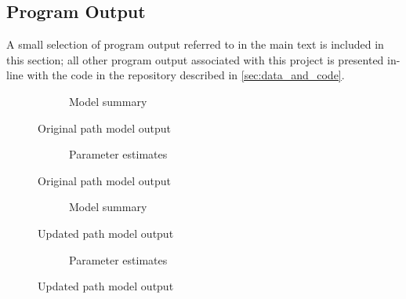 \documentclass[11pt,a4paper]{article}
\begin{document}
\clearpage
\subsection{Program Output}\label{sec:program_output}

A small selection of program output referred to in the main text is included in this section; all other program output associated with this project is presented in-line with the code in the repository described in \cref{sec:data_and_code}.

\pagestyle{empty}

\begin{figure}[htbp]
\begin{subfigure}{\textwidth}
\small{}
\caption{Model summary}
\end{subfigure}
\caption{Original path model output}
\label{fig:orig_model_output}
\end{figure}

\begin{figure}[htbp]\ContinuedFloat
\begin{subfigure}{\textwidth}

\caption{Parameter estimates}
\end{subfigure}
\caption{Original path model output}
\end{figure}

\begin{figure}[htbp]
\begin{subfigure}{\textwidth}
\small{}
\caption{Model summary}
\end{subfigure}
\caption{Updated path model output}
\label{fig:updated_model_output}
\end{figure}

\begin{figure}[htbp]\ContinuedFloat
\begin{subfigure}{\textwidth}

\caption{Parameter estimates}
\end{subfigure}
\caption{Updated path model output}
\end{figure}


\restoregeometry{}
\end{document}
